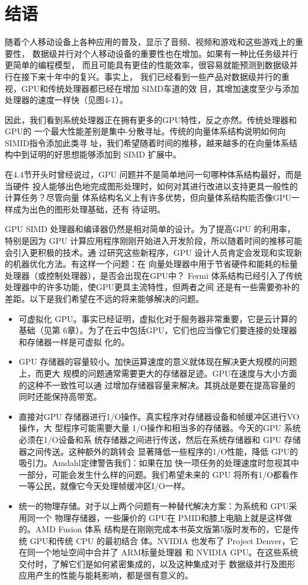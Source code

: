 \section{结语}
随着个人移动设备上各种应用的普及，显示了音频、视频和游戏和这些游戏上的重要性，
数据级并行对个人移动设备的重要性也在增加。如果有一种比任务级并行更简单的编程模型，
而且可能具有更佳的性能效率，很容易就能预测到数据级并行在接下来十年中的复兴。事实上，
我们已经看到一些产品对数据级并行的重视，GPU和传统处理器都已经在增加 SIMD车道的效
目，其增加速度至少与添加处理器的速度一样快（见图4-1）。

因此，我们看到系统处理器正在拥有更多的GPU特性，反之亦然。传统处理器和 GPU的
一个最大性能差别是集中-分散寻址。传统的向量体系结构说明如何向 SIMID指令添加此类寻
址，我们希望随着时间的推移，越来越多的在向量体系结构中到证明的好思想能够添加到
SIMD 扩展中。

在4.4节开头时曾经说过，GPU 问题并不是简单地问一句哪种体系结构最好，而是当硬件
投人能够出色地完成图形处理时，如何对其进行改进以支持更具一般性的计算任务？尽管向量
体系结构名义上有许多优势，但向量体系结构能否像GPU一样成为出色的图形处理基础，还有
待证明。

GPU SIMD 处理器和编译器仍然是相对简单的设计。为了提高GPU 的利用率，特别是因为
GPU 计算应用程序刚刚开始进入开发阶段，所以随着时间的推移可能会引入更积极的技术。通
过研究这些新程序，GPU 设计人员肯定会发现和实现新的机器优化方法。有这样一个问题：在
向量处理器中用于节省硬件和能耗的标量处理器（或控制处理器），是否会出现在GPU中？
Fermi 体系结构已经引入了传统处理器中的许多功能，使GPU更具主流特性，但两者之间
还是有一些需要弥补的差距。以下是我们希望在不远的将来能够解决的问题。

\begin{itemize}
    \item 可虚拟化 GPU。事实已经证明，虚拟化对于服务器非常重要，它是云计算的基础（见第
    6章）。为了在云中包括GPU，它们也应当像它们要连接的处理器和存储器一样是可虚拟
    化的。
    \item GPU 存储器的容量较小。加快运算速度的意义就体现在解决更大规模的问题上，而更大
    规模的问题通常需要更大的存储器足迹。GPU在速度与大小方面的这种不一致性可以通
    过增加存储器容量来解决。其挑战是要在提高容量的同时还能保持高带宽。
    \item 直接对GPU 存储器进行1/O操作。真实程序对存储器设备和帧缓冲区进行VO操作，大
    型程序可能需要大量 1/O操作和相当多的存储器。今天的GPU 系统必须在1/O设备和系
    统存储器之间进行传送，然后在系统存储器和 GPU 存储器之间传送。这种额外的跳转会
    显著降低一些程序的1/O性能，降低 GPU的吸引力。Amdahl定律警告我们：如果在加
    快一项任务的处理速度时忽视其中一部分，可能会发生什么样的问题。我们希望未来的
    GPU 将所有1/O都看作一等公民，就像它今天处理帧缓冲区I/O一样。
    \item 统一的物理存储。对于以上两个问题有一种替代解决方案：为系统和 GPU采用同一个
    物理存储器，一些廉价的 GPU在 PMID和膝上电脑上就是这样做的。AMD Fusion 体系
    结构是在刚刚完成本书英文版第5版时发布的，它是传统 GPU和传统 CPU 的最初结合
    体。NVIDIA 也发布了 Project Denver，它在同一个地址空间中合并了 ARM标量处理器
    和 NVIDIA GPU。在这些系统交付时，了解它们是如何紧密集成的，以及这种集成对于
    数据级并行及图形应用产生的性能与能耗影响，都是很有意义的。
\end{itemize}

